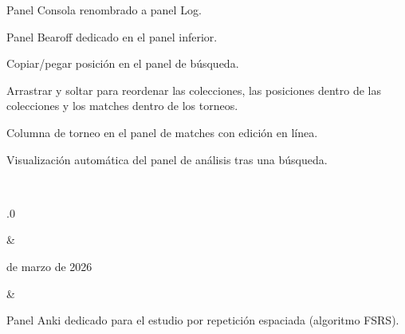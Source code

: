 \documentclass[letterpaper,10pt,spanish]{sphinxmanual}
\begin{document}
\begin{savenotes}
\begin{longtable}{}
\begin{varwidth}[t]{}
\sphinxAtStartPar
Panel Consola renombrado a panel Log.

\sphinxAtStartPar
Panel Bearoff dedicado en el panel inferior.

\sphinxAtStartPar
Copiar/pegar posición en el panel de búsqueda.

\sphinxAtStartPar
Arrastrar y soltar para reordenar las colecciones, las posiciones dentro de las colecciones y los matches dentro de los torneos.

\sphinxAtStartPar
Columna de torneo en el panel de matches con edición en línea.

\sphinxAtStartPar
Visualización automática del panel de análisis tras una búsqueda.
\sphinxbeforeendvarwidth
\end{varwidth}%
\\
\sphinxhline\begin{varwidth}[t]{}
.0
\sphinxbeforeendvarwidth
\end{varwidth}%
&\begin{varwidth}[t]{}
 de marzo de 2026
\sphinxbeforeendvarwidth
\end{varwidth}%
&\begin{varwidth}[t]{}
\sphinxAtStartPar
Panel Anki dedicado para el estudio por repetición espaciada (algoritmo FSRS).


\end{varwidth}
\end{longtable}
\end{savenotes}
\end{document}
